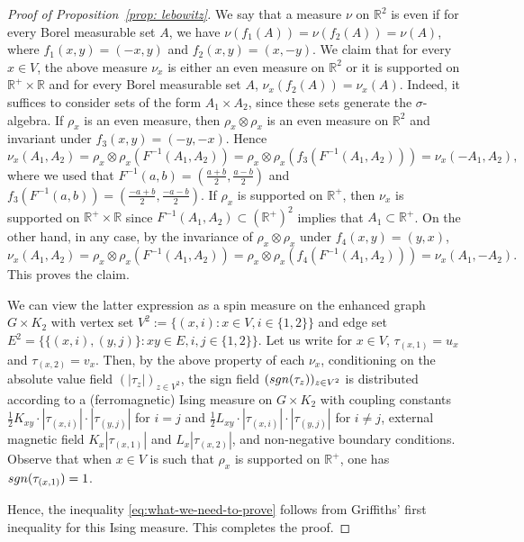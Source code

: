 \documentclass[10pt,a4paper]{amsart}
\begin{document}
\begin{proof}[Proof of Proposition~\textup{\ref{prop: lebowitz}}]
We say that a measure $\nu$ on $\mathbb{R}^2$ is even if for every Borel measurable set $A$, we have $\nu(f_1(A))=\nu(f_2(A))=\nu(A)$, where $f_1(x,y)=(-x,y)$ and $f_2(x,y)=(x,-y)$. We claim that for every $x\in V$, the above measure $\nu_x$ is either an even measure on $\mathbb{R}^2$ or it is supported on $\mathbb{R}^+\times \mathbb{R}$ and for every Borel measurable set $A$, $\nu_x(f_2(A))=\nu_x(A)$. Indeed, it suffices to consider sets of the form $A_1\times A_2$, since these sets generate the $\sigma$-algebra. If $\rho_x$ is an even measure, then $\rho_x\otimes \rho_x$ is an even measure on $\mathbb{R}^2$ and invariant under $f_3(x,y)=(-y,-x)$. Hence
\begin{equation}\nu_x(A_1,A_2)=\rho_x\otimes \rho_x(F^{-1}(A_1,A_2))=\rho_x\otimes \rho_x(f_3(F^{-1}(A_1,A_2)))=\nu_x(-A_1,A_2),
\end{equation}
where we used that $F^{-1}(a,b)=(\tfrac{a+b}{2},\tfrac{a-b}{2})$ and $f_3(F^{-1}(a,b))=(\tfrac{-a+b}{2},\tfrac{-a-b}{2})$.
If $\rho_x$ is supported on $\mathbb{R}^+$, then $\nu_x$ is supported on $\mathbb{R}^+\times \mathbb{R}$ since $F^{-1}(A_1,A_2)\subset (\mathbb{R}^+)^2$ implies that $A_1\subset \mathbb{R}^+$.
On the other hand, in any case, by the invariance of $\rho_x\otimes\rho_x$ under $f_4(x,y)=(y,x)$,
\begin{equation}
\nu_x(A_1,A_2)=\rho_x\otimes\rho_x(F^{-1}(A_1,A_2))=\rho_x\otimes\rho_x(f_4(F^{-1}(A_1,A_2)))=\nu_x(A_1,-A_2).
\end{equation}
This proves the claim.

We can view the latter expression as a spin measure on the enhanced graph $G\times K_2$ with vertex set $V^2:=\{(x,i): x\in V, i\in \{1,2\}\}$ and edge set $E^2=\{\{(x,i),(y,j)\}: xy\in E, i,j\in \{1,2\}\}$. Let us write for $x\in V$, $\tau_{(x,1)}=u_x$ and $\tau_{(x,2)}=v_x$. Then, by the above property of each $\nu_x$, conditioning on the absolute value field $(|\tau_z|)_{z\in V^2}$, the sign field $(\textup{sgn}(\tau_z))_{z\in V^2}$ is distributed according to a (ferromagnetic) Ising measure on $G\times K_2$ with coupling constants $\tfrac{1}{2} K_{xy}\cdot |\tau_{(x,i)}|\cdot |\tau_{(y,j)}|$ for $i=j$ and $\tfrac{1}{2}L_{xy}\cdot |\tau_{(x,i)}|\cdot |\tau_{(y,j)}|$ for $i\neq j$, external magnetic field $K_x|\tau_{(x,1)}|$ and $L_x|\tau_{(x,2)}|$, and non-negative boundary conditions. Observe that when $x\in V$ is such that $\rho_x$ is supported on $\mathbb R^+$, one has $\textup{sgn}(\tau_{(x,1)})=1$.

Hence, the inequality \eqref{eq:what-we-need-to-prove} follows from Griffiths' first inequality for this Ising measure. This completes the proof.
\end{proof}
\end{document}
